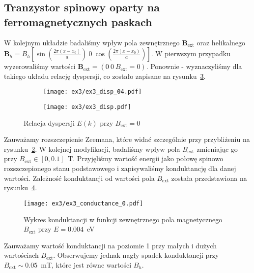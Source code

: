 \documentclass{article}
\begin{document}
\subsection{Tranzystor spinowy oparty na ferromagnetycznych paskach}
W kolejnym układzie badaliśmy wpływ pola zewnętrznego $\mathbf{B}_{\text{ext}}$ oraz helikalnego $\mathbf{B}_h = B_h\left[\sin\left(\frac{2\pi(x-x_0)}{a}\right) \ 0 \ \cos\left(\frac{2\pi (x-x_0)}{a}\right)\right]$.
W pierwszym przypadku wyzerowaliśmy wartości $\mathbf{B}_{\text{ext}} = (0 \ 0 \ B_{\text{ext}}=0)$.
Ponownie - wyznaczyliśmy dla takiego układu relację dyspersji, co zostało zapisane na rysunku~\ref{fig:ex3-relacja dyspersji}.
\begin{figure}[htp!]
    \centering
\begin{subfigure}{.495\textwidth}
    \texttt{[image: ex3/ex3\_disp\_04.pdf]}
    \caption{}
    \label{fig:ex3-rel-disp}
\end{subfigure}
\begin{subfigure}{.495\textwidth}
    \texttt{[image: ex3/ex3\_disp.pdf]}
    \caption{}
    \label{fig:ex3-rel-disp-przyb}
\end{subfigure}
\caption{Relacja dyspersji $E(k)$ przy $B_{\text{ext}}=0$}
    \label{fig:ex3-relacja dyspersji}
\end{figure}
Zauważamy rozszczepienie Zeemana, które widać szczególnie przy przybliżeniu na rysunku~\ref{fig:ex3-rel-disp-przyb}.
W kolejnej modyfikacji, badaliśmy wpływ pola $B_{\text{ext}}$ zmieniając go przy $B_{\text{ext}}\in[0,0.1]$~T.
Przyjęliśmy wartość energii jako połowę spinowo rozszczepionego stanu podstawowego i zapisywaliśmy konduktancję dla danej wartości.
Zależność konduktancji od wartości pola $B_{\text{ext}}$ została przedstawiona na rysunku~\ref{fig:ex3-conductance}.
\begin{figure}[htp!]
    \centering
    \texttt{[image: ex3/ex3\_conductance\_0.pdf]}
    \caption{Wykres konduktancji w funkcji zewnętrznego pola magnetycznego $B_{\text{ext}}$ przy $E = 0.004$~eV}
    \label{fig:ex3-conductance}
\end{figure}
Zauważamy wartość konduktancji na poziomie 1 przy małych i dużych wartościach $B_{\text{ext}}$.
Obserwujemy jednak nagły spadek konduktancji przy $B_{\text{ext}}\sim 0.05$~mT, które jest równe wartości $B_h$.
\end{document}
